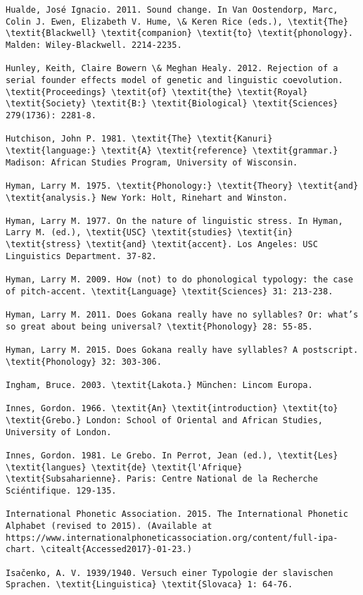 \begin{verbatim}
Hualde, José Ignacio. 2011. Sound change. In Van Oostendorp, Marc, Colin J. Ewen, Elizabeth V. Hume, \& Keren Rice (eds.), \textit{The} \textit{Blackwell} \textit{companion} \textit{to} \textit{phonology}. Malden: Wiley-Blackwell. 2214-2235.

Hunley, Keith, Claire Bowern \& Meghan Healy. 2012. Rejection of a serial founder effects model of genetic and linguistic coevolution. \textit{Proceedings} \textit{of} \textit{the} \textit{Royal} \textit{Society} \textit{B:} \textit{Biological} \textit{Sciences} 279(1736): 2281-8.

Hutchison, John P. 1981. \textit{The} \textit{Kanuri} \textit{language:} \textit{A} \textit{reference} \textit{grammar.} Madison: African Studies Program, University of Wisconsin.

Hyman, Larry M. 1975. \textit{Phonology:} \textit{Theory} \textit{and} \textit{analysis.} New York: Holt, Rinehart and Winston.

Hyman, Larry M. 1977. On the nature of linguistic stress. In Hyman, Larry M. (ed.), \textit{USC} \textit{studies} \textit{in} \textit{stress} \textit{and} \textit{accent}. Los Angeles: USC Linguistics Department. 37-82. 

Hyman, Larry M. 2009. How (not) to do phonological typology: the case of pitch-accent. \textit{Language} \textit{Sciences} 31: 213-238.

Hyman, Larry M. 2011. Does Gokana really have no syllables? Or: what’s so great about being universal? \textit{Phonology} 28: 55-85.

Hyman, Larry M. 2015. Does Gokana really have syllables? A postscript. \textit{Phonology} 32: 303-306.

Ingham, Bruce. 2003. \textit{Lakota.} München: Lincom Europa.

Innes, Gordon. 1966. \textit{An} \textit{introduction} \textit{to} \textit{Grebo.} London: School of Oriental and African Studies, University of London.

Innes, Gordon. 1981. Le Grebo. In Perrot, Jean (ed.), \textit{Les} \textit{langues} \textit{de} \textit{l'Afrique} \textit{Subsaharienne}. Paris: Centre National de la Recherche Sciéntifique. 129-135.

International Phonetic Association. 2015. The International Phonetic Alphabet (revised to 2015). (Available at https://www.internationalphoneticassociation.org/content/full-ipa-chart. \citealt{Accessed2017}-01-23.)

Isačenko, A. V. 1939/1940. Versuch einer Typologie der slavischen Sprachen. \textit{Linguistica} \textit{Slovaca} 1: 64-76.


\end{verbatim}
